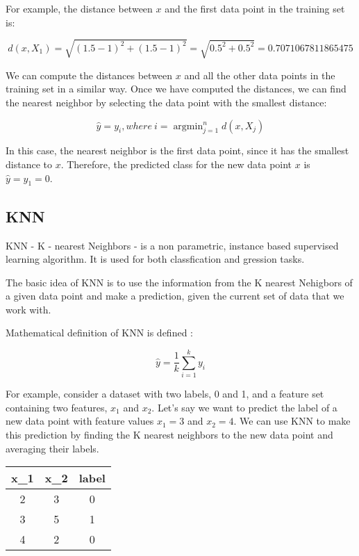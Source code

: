 \documentclass{article}
\theoremstyle{mytheoremstyle}
\theoremstyle{mytheoremstyle}
\theoremstyle{myproblemstyle}
\begin{document}
For example, the distance between $x$ and the first data point in the training set is:

$$d(x, X_1) = \sqrt{(1.5 - 1)^2 + (1.5 - 1)^2} = \sqrt{0.5^2 + 0.5^2} = 0.7071067811865475$$

We can compute the distances between $x$ and all the other data points in the training set in a similar way. Once we have computed the distances, we can find the nearest neighbor by selecting the data point with the smallest distance:

$$\hat{y} = y_i, where\ i = \operatorname{argmin}_{j=1}^n d(x, X_j)$$

In this case, the nearest neighbor is the first data point, since it has the smallest distance to $x$. Therefore, the predicted class for the new data point $x$ is $\hat{y} = y_1 = 0$.




\subsection{KNN}
KNN - K - nearest Neighbors - is a non parametric, instance based supervised learning algorithm. It is used for both classfication and gression tasks.

The basic idea of KNN is to use the information from the K nearest Nehigbors of a given data point and make a prediction, given the current set of data that we work with.

\begin{definition}
	Mathematical definition of KNN is defined :

	\begin{displaymath}
		\hat{y}  = \frac{1}{k} \sum_{i=1}^k y_i
	\end{displaymath}
\end{definition}

For example, consider a dataset with two labels, 0 and 1, and a feature set containing two features, $x_1$ and $x_2$. Let's say we want to predict the label of a new data point with feature values $x_1 = 3$ and $x_2 = 4$. We can use KNN to make this prediction by finding the K nearest neighbors to the new data point and averaging their labels.
\begin{center}
	\begin{tabular}{ c c c }
		x_1 & x_2 & label \\
		\hline
		2   & 3   & 0     \\
		3   & 5   & 1     \\
		4   & 2   & 0     \\
	\end{tabular}
\end{center}
\end{document}

